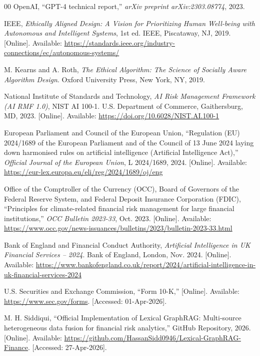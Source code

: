 \documentclass[conference]{IEEEtran}
\begin{document}
\begin{thebibliography}{00}
OpenAI, ``GPT-4 technical report,'' \textit{arXiv preprint arXiv:2303.08774}, 2023.

IEEE, \textit{Ethically Aligned Design: A Vision for Prioritizing Human Well-being with Autonomous and Intelligent Systems}, 1st ed. IEEE, Piscataway, NJ, 2019. [Online]. Available: \url{https://standards.ieee.org/industry-connections/ec/autonomous-systems/}

M. Kearns and A. Roth, \textit{The Ethical Algorithm: The Science of Socially Aware Algorithm Design}. Oxford University Press, New York, NY, 2019.

National Institute of Standards and Technology, \textit{AI Risk Management Framework (AI RMF 1.0)}, NIST AI 100-1. U.S. Department of Commerce, Gaithersburg, MD, 2023. [Online]. Available: \url{https://doi.org/10.6028/NIST.AI.100-1}

European Parliament and Council of the European Union, ``Regulation (EU) 2024/1689 of the European Parliament and of the Council of 13 June 2024 laying down harmonised rules on artificial intelligence (Artificial Intelligence Act),'' \textit{Official Journal of the European Union}, L 2024/1689, 2024. [Online]. Available: \url{https://eur-lex.europa.eu/eli/reg/2024/1689/oj/eng}

Office of the Comptroller of the Currency (OCC), Board of Governors of the Federal Reserve System, and Federal Deposit Insurance Corporation (FDIC), ``Principles for climate-related financial risk management for large financial institutions,'' \textit{OCC Bulletin 2023-33}, Oct. 2023. [Online]. Available: \url{https://www.occ.gov/news-issuances/bulletins/2023/bulletin-2023-33.html}

Bank of England and Financial Conduct Authority, \textit{Artificial Intelligence in UK Financial Services -- 2024}. Bank of England, London, Nov. 2024. [Online]. Available: \url{https://www.bankofengland.co.uk/report/2024/artificial-intelligence-in-uk-financial-services-2024}

U.S. Securities and Exchange Commission, ``Form 10-K,'' [Online]. Available: \url{https://www.sec.gov/forms}. [Accessed: 01-Apr-2026].

M. H. Siddiqui, ``Official Implementation of Lexical GraphRAG: Multi-source heterogeneous data fusion for financial risk analytics,'' GitHub Repository, 2026. [Online]. Available: \url{https://github.com/HassanSidd0946/Lexical-GraphRAG-Finance}. [Accessed: 27-Apr-2026].
\end{thebibliography}
\end{document}
